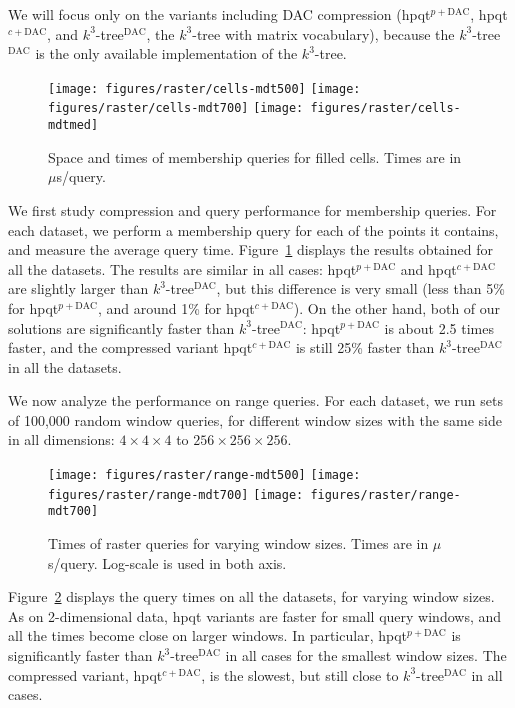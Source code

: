 \documentclass{elsarticle}
\newcommand{\DAC}{\ensuremath{\mathrm{DAC}}}
\newcommand{\koct}{$k^3$-tree\xspace}
\newcommand{\koctdac}{$k^3$-tree$^{\DAC}$\xspace}
\newcommand{\hpqt}{\textsf{hpqt}\xspace}
\newcommand{\hpqtpdac}{\textsf{hpqt$^{p+\DAC}$}\xspace}
\newcommand{\hpqtRdac}{\textsf{hpqt$^{c+\DAC}$}\xspace}
\begin{document}
We will focus only on the variants including DAC compression (\hpqtpdac, \hpqtRdac, and \koctdac, the \koct with matrix vocabulary), because the \koctdac is the only available implementation of the \koct.

\begin{figure}[t]
 \centering
    \texttt{[image: figures/raster/cells-mdt500]}
    \texttt{[image: figures/raster/cells-mdt700]}
     \texttt{[image: figures/raster/cells-mdtmed]}
  \caption{Space and times of membership queries for filled cells. Times are in $\mu$s/query.}
  \label{fig:rastermember}
\end{figure}

We first study compression and query performance for membership queries. For each dataset, we perform a membership query for each of the points it contains, and measure the average query time. Figure~\ref{fig:rastermember} displays the results obtained for all the datasets. The results are similar in all cases: \hpqtpdac and \hpqtRdac are slightly larger than \koctdac, but this difference is very small (less than 5\% for \hpqtpdac, and around 1\% for \hpqtRdac). On the other hand, both of our solutions are significantly faster than \koctdac: \hpqtpdac is about 2.5 times faster, and the compressed variant \hpqtRdac is still 25\% faster than \koctdac in all the datasets.

We now analyze the performance on range queries. For each dataset, we run sets of 100,000 random window queries, for different window sizes with the same side in all dimensions: $4 \times 4 \times 4$ to $256 \times 256 \times 256$. 

\begin{figure}[t]
 \centering
    \texttt{[image: figures/raster/range-mdt500]}
    \texttt{[image: figures/raster/range-mdt700]}
    \texttt{[image: figures/raster/range-mdt700]}
  \caption{Times of raster queries for varying window sizes. Times are in $\mu$s/query. Log-scale is used in both axis.}
  \label{fig:rasterwindow}
\end{figure}

Figure~\ref{fig:rasterwindow} displays the query times on all the datasets, for varying window sizes. As on 2-dimensional data, \hpqt variants are faster for small query windows, and all the times become close on larger windows. In particular, \hpqtpdac is significantly faster than \koctdac in all cases for the smallest window sizes. The compressed variant, \hpqtRdac, is the slowest, but still close to \koctdac in all cases. 
\end{document}
